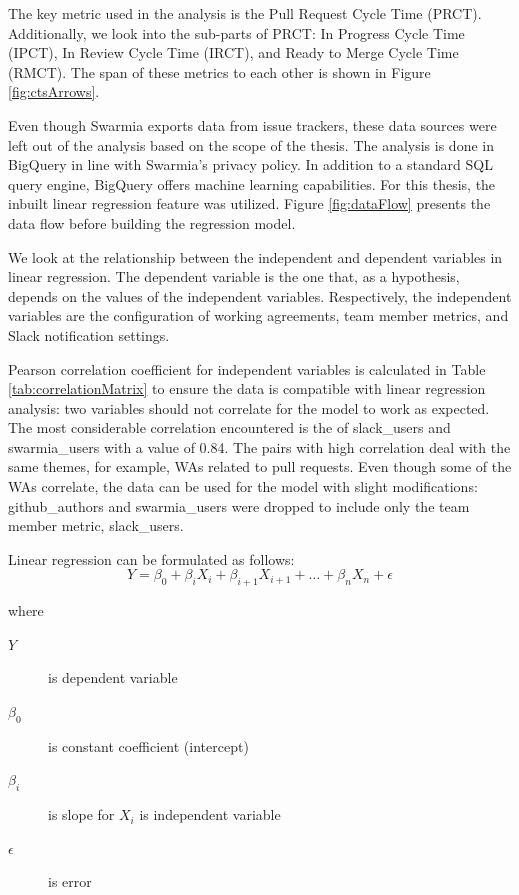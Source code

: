 The key metric used in the analysis is the Pull Request Cycle Time (PRCT). Additionally, we look into the sub-parts of PRCT: In Progress Cycle Time (IPCT), In Review Cycle Time (IRCT), and Ready to Merge Cycle Time (RMCT). The span of these metrics to each other is shown in Figure \ref{fig:ctsArrows}. 

Even though Swarmia exports data from issue trackers, these data sources were left out of the analysis based on the scope of the thesis. The analysis is done in BigQuery in line with Swarmia's privacy policy. In addition to a standard SQL query engine, BigQuery offers machine learning capabilities. For this thesis, the inbuilt linear regression feature was utilized. Figure \ref{fig:dataFlow} presents the data flow before building the regression model. 

We look at the relationship between the independent and dependent variables in linear regression. The dependent variable is the one that, as a hypothesis, depends on the values of the independent variables. Respectively, the independent variables are the configuration of working agreements, team member metrics, and Slack notification settings. 



Pearson correlation coefficient for independent variables is calculated in Table \ref{tab:correlationMatrix} to ensure the data is compatible with linear regression analysis: two variables should not correlate for the model to work as expected. The most considerable correlation encountered is the of slack\_users and swarmia\_users with a value of 0.84. The pairs with high correlation deal with the same themes, for example, WAs related to pull requests. Even though some of the WAs correlate, the data can be used for the model with slight modifications: github\_authors and swarmia\_users were dropped to include only the team member metric, slack\_users. 

\begin{samepage}

Linear regression can be formulated as follows:
\begin{equation}
Y = \beta_0 + \beta_i X_i + \beta_{i+1} X_{i+1} + \ldots + \beta_n X_n + \epsilon
\end{equation}

where
\begin{description}
\item[$Y$] is dependent variable
\item[$\beta_0$] is constant coefficient (intercept)
\item[$\beta_i$] is slope for $X_i$
\itenm[$X_i$] is independent variable
\item[$\epsilon$] is error
\end{description}

\end{samepage}

